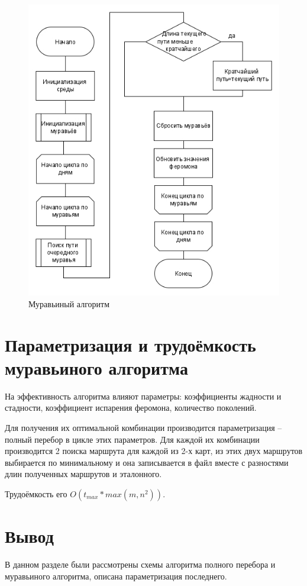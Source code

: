 \begin{figure}[H]
	\centering
	\includegraphics[width=0.7\linewidth]{src/ant}
	\caption{Муравьиный алгоритм}
	\label{fig:ant}
\end{figure}

\section{Параметризация и трудоёмкость муравьиного алгоритма}
\label{sec:parametrisation}
На эффективность алгоритма влияют параметры: коэффициенты жадности и стадности, коэффициент испарения феромона, количество поколений. 
\par Для получения их оптимальной комбинации производится параметризация -- полный перебор в цикле этих параметров. Для каждой их комбинации производится 2 поиска маршрута для каждой из 2-х карт, из этих двух маршрутов выбирается по минимальному и она  записывается в файл вместе с разностями длин полученных маршрутов и эталонного.
\par Трудоёмкость его $O(t_{max}*max(m,n^2))$.

\section{Вывод}
\label{sec:design_conclusion}
В данном разделе были рассмотрены схемы алгоритма полного перебора и муравьиного алгоритма, описана параметризация последнего.